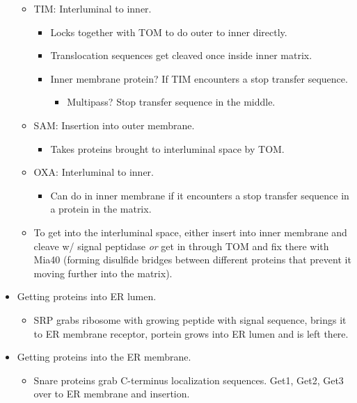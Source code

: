 \documentclass[../notes.tex]{subfiles}
\begin{document}
\begin{itemize}
\begin{itemize}
        \item TIM: Interluminal to inner.
        \begin{itemize}
            \item Locks together with TOM to do outer to inner directly.
            \item Translocation sequences get cleaved once inside inner matrix.
            \item Inner membrane protein? If TIM encounters a stop transfer sequence.
            \begin{itemize}
                \item Multipass? Stop transfer sequence in the middle.
            \end{itemize}
        \end{itemize}
        \item SAM: Insertion into outer membrane.
        \begin{itemize}
            \item Takes proteins brought to interluminal space by TOM.
        \end{itemize}
        \item OXA: Interluminal to inner.
        \begin{itemize}
            \item Can do in inner membrane if it encounters a stop transfer sequence in a protein in the matrix.
        \end{itemize}
        \item To get into the interluminal space, either insert into inner membrane and cleave w/ signal peptidase \emph{or} get in through TOM and fix there with Mia40 (forming disulfide bridges between different proteins that prevent it moving further into the matrix).
    \end{itemize}
    \item Getting proteins into ER lumen.
    \begin{itemize}
        \item SRP grabs ribosome with growing peptide with signal sequence, brings it to ER membrane receptor, portein grows into ER lumen and is left there.
    \end{itemize}
    \item Getting proteins into the ER membrane.
    \begin{itemize}
        \item Snare proteins grab C-terminus localization sequences. Get1, Get2, Get3 over to ER membrane and insertion.
    \end{itemize}

\end{itemize}
\end{document}
